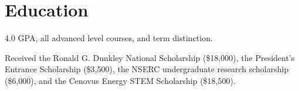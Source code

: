 \section{Education}

\begin{resumeItem}
\begin{resumeList}
    \item 4.0 GPA, all advanced level courses, and term distinction.
    \item Received the Ronald G. Dunkley National Scholarship (\$18,000), the President's Entrance Scholarship (\$3,500), the NSERC undergraduate research scholarship (\$6,000), and the Cenovus Energy STEM Scholarship (\$18,500).
\end{resumeList}
\end{resumeItem}


